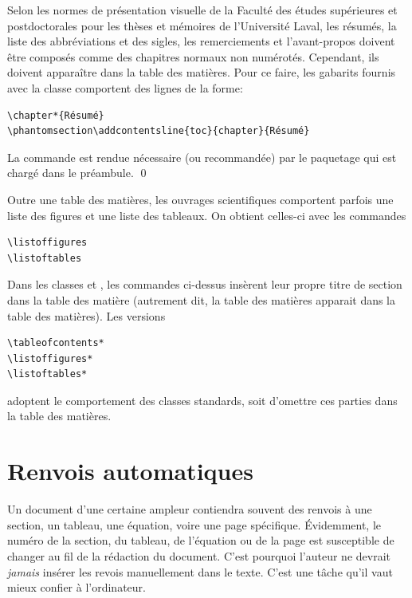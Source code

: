 \begin{exemple}
  Selon les normes de présentation visuelle de la Faculté des études
  supérieures et postdoctorales pour les thèses et mémoires de
  l'Université Laval, les résumés, la liste des abbréviations et des
  sigles, les remerciements et l'avant-propos doivent être composés
  comme des chapitres normaux non numérotés. Cependant, ils doivent
  apparaître dans la table des matières. Pour ce faire, les gabarits
  fournis avec la classe  comportent des lignes de la
  forme:
\begin{lstlisting}
\chapter*{Résumé}
\phantomsection\addcontentsline{toc}{chapter}{Résumé}
\end{lstlisting}
  La commande  est rendue nécessaire (ou
  recommandée) par le paquetage  qui est chargé dans le
  préambule. %
  \qed
\end{exemple}

Outre une table des matières, les ouvrages scientifiques
comportent parfois une liste des figures et une liste des tableaux. On
obtient celles-ci avec les commandes
\begin{lstlisting}
\listoffigures
\listoftables
\end{lstlisting}

Dans les classes  et , les commandes
ci-dessus insèrent leur propre titre de section dans la table des
matière (autrement dit, la table des matières apparait dans la table
des matières). Les versions
\begin{lstlisting}
\tableofcontents*
\listoffigures*
\listoftables*
\end{lstlisting}
adoptent le comportement des classes standards, soit d'omettre ces
parties dans la table des matières.


\section{Renvois automatiques}
\label{sec:organisation:renvois}

Un document d'une certaine ampleur contiendra souvent des renvois à
une section, un tableau, une équation, voire une page
spécifique. Évidemment, le numéro de la section, du tableau, de
l'équation ou de la page est susceptible de changer au fil de la
rédaction du document. C'est pourquoi l'auteur ne devrait
\emph{jamais} insérer les revois manuellement dans le texte. C'est une
tâche qu'il vaut mieux confier à l'ordinateur.

